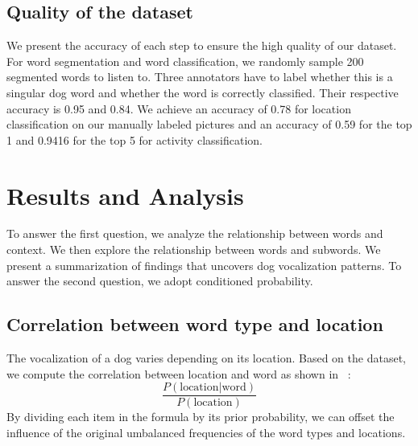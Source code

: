 \subsection{Quality of the dataset}
We present the accuracy of each step to ensure the high quality of our dataset. For word segmentation and word classification, we randomly sample 200 segmented words to listen to. Three annotators have to label whether this is a singular dog word and whether the word is correctly classified. Their respective accuracy is 0.95 and 0.84. We achieve an accuracy of 0.78 for location classification on our manually labeled pictures and an accuracy of 0.59 for the top 1 and 0.9416 for the top 5 for activity classification.

\section{Results and Analysis}
\label{sec:results}
To answer the first question, we analyze the relationship between words and context. We then explore the relationship between words and subwords. We present a summarization of findings that uncovers dog vocalization patterns. To answer the second question, we adopt conditioned probability. 
 
\subsection{Correlation between word type and location}
The vocalization of a dog varies depending on its location. Based on the dataset, we compute the correlation between location and word as shown in ~: 
\begin{equation}
\frac{P (\text{location}| \text{word})}{P(\text{location})}
\end{equation}
By dividing each item in the formula by its prior probability, we can offset the influence of the original umbalanced frequencies of the word types and locations. 

